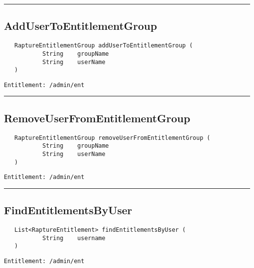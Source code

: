 \rule{12cm}{2pt}
\subsection{AddUserToEntitlementGroup}
\label{Api:AddUserToEntitlementGroup}
\begin{Verbatim}
   RaptureEntitlementGroup addUserToEntitlementGroup (
           String    groupName
           String    userName
   )
\end{Verbatim}
\begin{Verbatim}[formatcom=\color{Maroon}]
  Entitlement: /admin/ent
\end{Verbatim}



\rule{12cm}{2pt}
\subsection{RemoveUserFromEntitlementGroup}
\label{Api:RemoveUserFromEntitlementGroup}
\begin{Verbatim}
   RaptureEntitlementGroup removeUserFromEntitlementGroup (
           String    groupName
           String    userName
   )
\end{Verbatim}
\begin{Verbatim}[formatcom=\color{Maroon}]
  Entitlement: /admin/ent
\end{Verbatim}



\rule{12cm}{2pt}
\subsection{FindEntitlementsByUser}
\label{Api:FindEntitlementsByUser}
\begin{Verbatim}
   List<RaptureEntitlement> findEntitlementsByUser (
           String    username
   )
\end{Verbatim}
\begin{Verbatim}[formatcom=\color{Maroon}]
  Entitlement: /admin/ent
\end{Verbatim}



